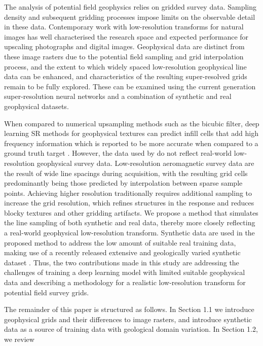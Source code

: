 \documentclass[manuscript.tex]{subfiles}
\begin{document}
The analysis of potential field geophysics relies on gridded survey data.
Sampling density and subsequent gridding processes impose limits on the observable detail in these data.
Contemporary work with low-resolution transforms for natural images \parencite[reviewed in][]{moserHitchhikerGuideSuperResolution2023} has well characterised the research space and expected performance for upscaling photographs and digital images.
Geophysical data are distinct from these image rasters due to the potential field sampling and grid interpolation process, and the extent to which widely spaced low-resolution geophysical line data can be enhanced, and characteristics of the resulting super-resolved grids remain to be fully explored.
These can be examined using the current generation super-resolution neural networks and a combination of synthetic and real geophysical datasets.

When compared to numerical upsampling methods such as the bicubic filter, deep learning SR methods for geophysical textures can predict infill cells that add high frequency information which is reported to be more accurate when compared to a ground truth target \parencite{smithMagneticGridResolution2022}.
However, the data used by \textcite{smithMagneticGridResolution2022} do not reflect real-world low-resolution geophysical survey data.
Low-resolution aeromagnetic survey data are the result of wide line spacings during acquisition, with the resulting grid cells predominantly being those predicted by interpolation between sparse sample points.
Achieving higher resolution traditionally requires additional sampling to increase the grid resolution, which refines structures in the response and reduces blocky textures and other gridding artifacts.
We propose a method that simulates the line sampling of both synthetic and real data, thereby more closely reflecting a real-world geophysical low-resolution transform.
Synthetic data are used in the proposed method to address the low amount of suitable real training data, making use of a recently released extensive and geologically varied synthetic dataset \parencite{jessellNoddyverseMassiveData2022}.
Thus, the two contributions made in this study are addressing the challenges of training a deep learning model with limited suitable geophysical data and describing a methodology for a realistic low-resolution transform for potential field survey grids.

The remainder of this paper is structured as follows.
In Section 1.1 we introduce geophysical grids and their differences to image rasters, and introduce synthetic data as a source of training data with geological domain variation.
In Section 1.2, we review
\end{document}
